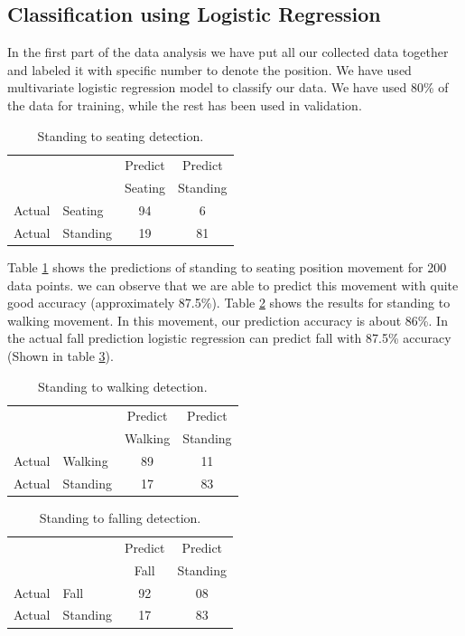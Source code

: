 \documentclass{llncs}
\begin{document}
\begin{sloppy}
\subsection{Classification using Logistic Regression}

In the first part of the data analysis we have put all our collected data together and labeled it
with specific number to denote the position. We have used multivariate logistic regression model to
classify our data. We have used 80\% of the data for training, while the rest has been used
in validation.

\begin{table}[!h]
	\caption{Standing to seating detection.}	
	\label{tab:StandingToSeatingDetection}
	\centering
		\begin{tabular} {l l |c |c}
			& & Predict& Predict \\ 
			& & Seating & Standing \\ \hline
			Actual& Seating & 94 & 6\\ \hline
			Actual& Standing & 19& 81\\ \hline
		\end{tabular}
\end{table}

Table \ref{tab:StandingToSeatingDetection} shows the predictions of standing to seating position
movement for 200 data points. we can observe that we are able
to predict this movement with quite good accuracy (approximately 87.5\%). Table
 \ref{tab:StandingToWalkingDetection} shows the results for  standing to walking movement. In this
movement, our prediction accuracy is about 86\%. In the actual fall prediction logistic
regression can predict fall with 87.5\% accuracy (Shown in table
 \ref{tab:StandingToFallingDetection}).
\vspace{-5mm}
\begin{table}
\caption{Standing to walking detection.}
	\label{tab:StandingToWalkingDetection}
\centering
		\begin{tabular} {l l |c |c}
			& & Predict& Predict \\ 
			& & Walking & Standing \\ \hline
			Actual& Walking & 89 & 11\\ \hline
			Actual& Standing & 17& 83\\ \hline
		\end{tabular}
\end{table}
\vspace{-10mm}
\begin{table}[!h]
\caption{Standing to falling detection.}
\label{tab:StandingToFallingDetection}
\centering
		\begin{tabular} {l l |c |c}
			& & Predict& Predict \\ 
			& & Fall & Standing \\ \hline
			Actual& Fall & 92 & 08\\ \hline
			Actual& Standing & 17& 83\\ \hline
		\end{tabular}
\end{table}
\vspace{-5mm}

\end{sloppy}
\end{document}
